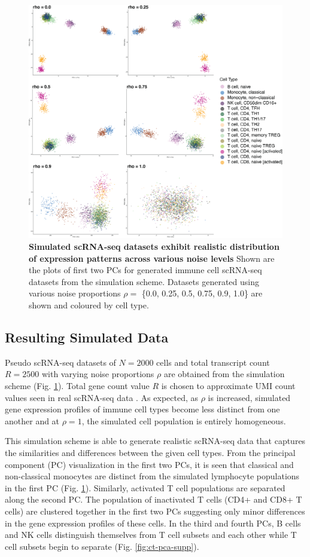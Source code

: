 \begin{figure}
    \centering
    \includegraphics[width=\textwidth]{Figures/sim_data_PCA.png}
    \caption{\textbf{Simulated scRNA-seq datasets exhibit realistic distribution of expression patterns across various noise levels} Shown are the plots of first two PCs for generated immune cell scRNA-seq datasets from the simulation scheme. Datasets generated using various noise proportions $\rho =$ \{0.0, 0.25, 0.5, 0.75, 0.9, 1.0\} are shown and coloured by cell type.}
    \label{fig:ct-pca}
\end{figure}
\subsection{Resulting Simulated Data}
Pseudo scRNA-seq datasets of $N = 2000$ cells and total transcript count $R = 2500$ with varying noise proportions $\rho$ are obtained from the simulation scheme (Fig. \ref{fig:ct-pca}). Total gene count value $R$ is chosen to approximate UMI count values seen in real scRNA-seq data \cite{Hafemeister_2019}. As expected, as $\rho$ is increased, simulated gene expression profiles of immune cell types become less distinct from one another and at $\rho = 1$, the simulated cell population is entirely homogeneous. 

This simulation scheme is able to generate realistic scRNA-seq data that captures the similarities and differences between the given cell types. From the principal component (PC) visualization in the first two PCs, it is seen that classical and non-classical monocytes are distinct from the simulated lymphocyte populations in the first PC (Fig. \ref{fig:ct-pca}). Similarly, activated T cell populations are separated along the second PC. The population of inactivated T cells (CD4+ and CD8+ T cells) are clustered together in the first two PCs suggesting only minor differences in the gene expression profiles of these cells. In the third and fourth PCs, B cells and NK cells distinguish themselves from T cell subsets and each other while T cell subsets begin to separate (Fig. \ref{fig:ct-pca-supp}).

